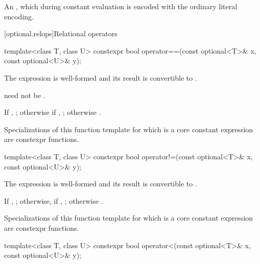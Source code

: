 \begin{itemdescr}
\pnum
\returns
An  \ntbs{},
which during constant evaluation is encoded with
the ordinary literal encoding.
\end{itemdescr}

[optional.relops]{Relational operators}

%
\begin{itemdecl}
template<class T, class U> constexpr bool operator==(const optional<T>& x, const optional<U>& y);
\end{itemdecl}

\begin{itemdescr}
\pnum
\constraints
The expression  is well-formed and
its result is convertible to .
\begin{note}
 need not be .
\end{note}

\pnum
\returns
If , ; otherwise if , ; otherwise .

\pnum
\remarks
Specializations of this function template
for which  is a core constant expression
are constexpr functions.
\end{itemdescr}

%
\begin{itemdecl}
template<class T, class U> constexpr bool operator!=(const optional<T>& x, const optional<U>& y);
\end{itemdecl}

\begin{itemdescr}
\pnum
\constraints
The expression  is well-formed and
its result is convertible to .

\pnum
\returns
If , ;
otherwise, if , ;
otherwise .

\pnum
\remarks
Specializations of this function template
for which  is a core constant expression
are constexpr functions.
\end{itemdescr}

%
\begin{itemdecl}
template<class T, class U> constexpr bool operator<(const optional<T>& x, const optional<U>& y);
\end{itemdecl}

